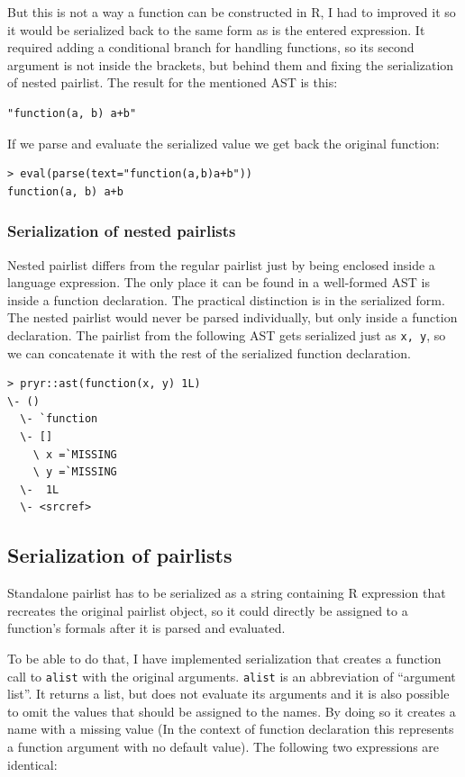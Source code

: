 \documentclass[thesis=B,english]{FITthesis}[2012/10/20]
\begin{document}
But this is not a way a function can be constructed in R, I had to improved it so it would be serialized back to the same form as is the entered expression. It required adding a conditional branch for handling functions, so its second argument is not inside the brackets, but behind them and fixing the serialization of nested pairlist. The result for the mentioned AST is this:

\begin{verbatim}
"function(a, b) a+b"
\end{verbatim}

If we parse and evaluate the serialized value we get back the original function:

\begin{verbatim}
> eval(parse(text="function(a,b)a+b"))
function(a, b) a+b
\end{verbatim}

\subsubsection{Serialization of nested pairlists}
Nested pairlist differs from the regular pairlist just by being enclosed inside a language expression. The only place it can be found in a well-formed AST is inside a function declaration. The practical distinction is in the serialized form. The nested pairlist would never be parsed individually, but only inside a function declaration. 
The pairlist from the following AST gets serialized just as \verb|x, y|, so we can concatenate it with the rest of the serialized function declaration.

\begin{verbatim}
> pryr::ast(function(x, y) 1L)
\- ()
  \- `function
  \- []
    \ x =`MISSING
    \ y =`MISSING
  \-  1L
  \- <srcref>
\end{verbatim}
\subsection{Serialization of pairlists}
Standalone pairlist has to be serialized as a string containing R expression that recreates the original pairlist object, so it could directly be assigned to a function’s formals after it is parsed and evaluated.

To be able to do that, I have implemented serialization that creates a function call to \verb|alist| with the original arguments. \verb|alist| is an abbreviation of “argument list”. It returns a list, but does not evaluate its arguments and it is also possible to omit the values that should be assigned to the names. By doing so it creates a name with a missing value (In the context of function declaration this represents a function argument with no default value). The following two expressions are identical:
\end{document}
